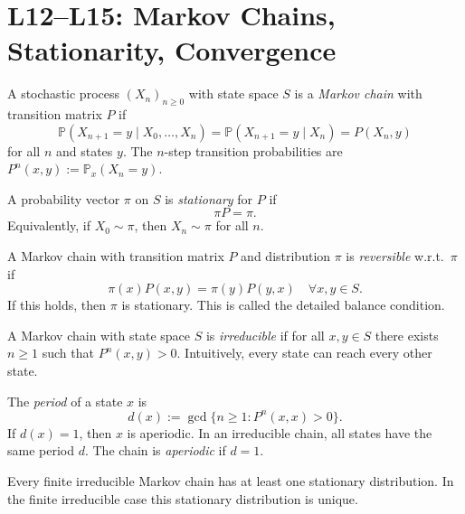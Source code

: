\documentclass[answers,12pt,addpoints]{exam}
\begin{document}
\section{L12–L15: Markov Chains, Stationarity, Convergence}

\begin{definition}
A stochastic process $(X_n)_{n\ge 0}$ with state space $S$ is a \emph{Markov chain} with transition matrix $P$ if
\[
\mathbb{P}(X_{n+1}=y \mid X_0,\dots,X_n) = \mathbb{P}(X_{n+1}=y\mid X_n) = P(X_n,y)
\]
for all $n$ and states $y$. The $n$-step transition probabilities are $P^n(x,y) := \mathbb{P}_x(X_n=y)$.
\end{definition}

\begin{definition}
A probability vector $\pi$ on $S$ is \emph{stationary} for $P$ if
\[
\pi P = \pi.
\]
Equivalently, if $X_0\sim \pi$, then $X_n\sim \pi$ for all $n$.
\end{definition}

\begin{definition}
A Markov chain with transition matrix $P$ and distribution $\pi$ is \emph{reversible} w.r.t.\ $\pi$ if
\[
\pi(x) P(x,y) = \pi(y) P(y,x) \quad \forall x,y\in S.
\]
If this holds, then $\pi$ is stationary. This is called the detailed balance condition.
\end{definition}

\begin{definition}[Irreducibility]
A Markov chain with state space $S$ is \emph{irreducible} if for all $x,y\in S$ there exists $n\ge 1$ such that $P^n(x,y)>0$. Intuitively, every state can reach every other state.
\end{definition}

\begin{definition}
The \emph{period} of a state $x$ is
\[
d(x) := \gcd\{n\ge 1 : P^n(x,x)>0\}.
\]
If $d(x)=1$, then $x$ is aperiodic. In an irreducible chain, all states have the same period $d$. The chain is \emph{aperiodic} if $d=1$.
\end{definition}

\begin{theorem}
Every finite irreducible Markov chain has at least one stationary distribution. In the finite irreducible case this stationary distribution is unique.
\end{theorem}
\end{document}
